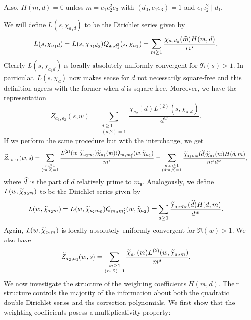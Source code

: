 \documentclass[12pt,reqno,oneside]{amsart}
\begin{document}
    \begin{remark}\label{rem:weighting_coefficient_remark}
        Also, $H(m,d) = 0$ unless $m = e_{1}e_{2}^{2}e_{3}$ with $(d_{0},e_{1}e_{3}) = 1$ and $e_{1}e_{2}^{2} \mid d_{1}$.
    \end{remark}

    We will define $L(s,\chi_{a_{1}d})$ to be the Dirichlet series given by
    \[
        L(s,\chi_{a_{1}d}) = L(s,\chi_{a_{1}d_{0}})Q_{d_{0}d_{1}^{2}}(s,\chi_{a_{1}}) = \sum_{m \ge 1}\frac{\chi_{a_{1}d_{0}}(\widehat{m})H(m,d)}{m^{s}}.
    \]
    Clearly $L(s,\chi_{a_{1}d})$ is locally absolutely uniformly convergent for $\Re(s) > 1$. In particular, $L(s,\chi_{d})$ now makes sense for $d$ not necessarily square-free and this definition agrees with the former when $d$ is square-free. Moreover, we have the representation
    \[
        Z_{a_{1},a_{2}}(s,w) = \sum_{\substack{d \ge 1 \\ (d,2) = 1}}\frac{\chi_{a_{2}}(d)L^{(2)}(s,\chi_{a_{1}d})}{d^{w}}.
    \]
    If we perform the same procedure but with the interchange, we get
    \[
        \widetilde{Z}_{a_{2},a_{1}}(w,s) = \sum_{\substack{m \ge 1 \\ (m,2) = 1}}\frac{L^{(2)}(w,\widetilde{\chi}_{a_{2}m_{0}})\widetilde{\chi}_{a_{1}}(m)Q_{m_{0}m_{1}^{2}}(w,\widetilde{\chi}_{a_{2}})}{m^{s}} = \sum_{\substack{d,m \ge 1 \\ (dm,2) = 1}}\frac{\widetilde{\chi}_{a_{2}m_{0}}(\widehat{d})\widetilde{\chi}_{a_{1}}(m)H(d,m)}{m^{s}d^{w}},
    \]
    where $\widehat{d}$ is the part of $d$ relatively prime to $m_{0}$. Analogously, we define $L(w,\widetilde{\chi}_{a_{2}m})$ to be the Dirichlet series given by
    \[
        L(w,\widetilde{\chi}_{a_{2}m}) = L(w,\widetilde{\chi}_{a_{2}m_{0}})Q_{m_{0}m_{1}^{2}}(w,\widetilde{\chi}_{a_{2}}) = \sum_{d \ge 1}\frac{\widetilde{\chi}_{a_{2}m_{0}}(\widehat{d})H(d,m)}{d^{w}}.
    \]
    Again, $L(w,\widetilde{\chi}_{a_{2}m})$ is locally absolutely uniformly convergent for $\Re(w) > 1$. We also have
    \[
        \widetilde{Z}_{a_{2},a_{1}}(w,s) = \sum_{\substack{m \ge 1 \\ (m,2) = 1}}\frac{\widetilde{\chi}_{a_{1}}(m)L^{(2)}(w,\widetilde{\chi}_{a_{2}m})}{m^{s}}.
    \]
    We now investigate the structure of the weighting coefficients $H(m,d)$. Their structure controls the majority of the information about both the quadratic double Dirichlet series and the correction polynomials. We first show that the weighting coefficients posess a multiplicativity property:
\end{document}
